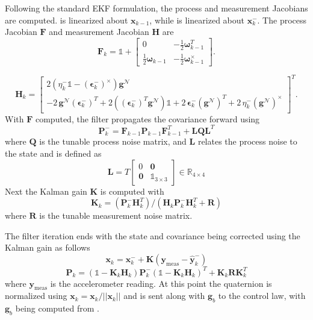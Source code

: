 Following the standard EKF formulation, the process and measurement Jacobians are computed.  is linearized about $\bm{x}_{k-1}$, while  is linearized about $\bm{x}_k^-$. The process Jacobian $\bm{F}$ and measurement Jacobian $\bm{H}$ are 
\begin{equation}
    \bm{F}_k = \mathbb{1}+
\begin{bmatrix}
0 & -\tfrac{1}{2}\bm{\omega}_{k-1}^{T}\\[3pt]
\tfrac{1}{2}\bm{\omega}_{k-1} & -\tfrac{1}{2}\bm{\omega}_{k-1}^{\times}
\end{bmatrix}.
\end{equation}

\begin{equation}
\bm{H}_k =
\begin{bmatrix}
2\!\left(\eta_k^- \mathbb{1} - (\bm{\epsilon}_k^-)^{\times}\right)\bm{g}^{\mathcal N}
\\
-2\,\bm{g}^{\mathcal N}(\bm{\epsilon}_k^-)^{\!T}
+2\!\left((\bm{\epsilon}_k^-)^{\!T}\bm{g}^{\mathcal N}\right)\mathbb{1}
+2\,\bm{\epsilon}_k^- (\bm{g}^{\mathcal N})^{\!T}
+2\,\eta_k^- (\bm{g}^{\mathcal N})^{\times}
\end{bmatrix}^T.
\end{equation}
With $\bm{F}$ computed, the filter propagates the covariance forward using
\begin{equation}
        \bm{P}_k^- = \bm{F}_{k-1}\bm{P}_{k-1}\bm{F}_{k-1}^T + \bm{L}\bm{Q}\bm{L}^T
\end{equation}
where $\bm{Q}$ is the tunable process noise matrix, and $\bm{L}$ relates the process noise to the state and is defined as
\begin{equation}
    \bm{L} = T\begin{bmatrix}
        0      & \bm{0} \\
        \bm{0} & \mathbb{1}_{3\times3}
    \end{bmatrix}\in\mathbb{R}_{4\times4}
\end{equation}
Next the Kalman gain $\bm{K}$ is computed with
\begin{equation}
    \bm{K}_k = (\bm{P}_k^-\bm{H}_k^T)/(\bm{H}_k\bm{P}_k^-\bm{H}_k^T + \bm{R})
\end{equation}
where $\bm{R}$ is the tunable measurement noise matrix.

The filter iteration ends with the state and covariance being corrected using the Kalman gain as follows
\begin{equation}
    \bm{x}_k = \bm{x}_k^- + \bm{K}(\bm{y}_{\text{meas}}-\hat{\bm{y}}_k^-)
\end{equation}
\begin{equation}
    \bm{P}_k = (\mathbb{1} - \bm{K}_k\bm{H}_k)\bm{P}_k^-(\mathbb{1} - \bm{K}_k\bm{H}_k)^T
    + \bm{K}_k\bm{R}\bm{K}_k^T
\end{equation}
where $\bm{y}_{\text{meas}}$ is the accelerometer reading. At this point the quaternion is normalized using $\bm{x}_k = \bm{x}_k / ||\bm{x}_k||$ and is sent along with $\bm{g}_b$ to the control law, with $\bm{g}_b$ being computed from .

